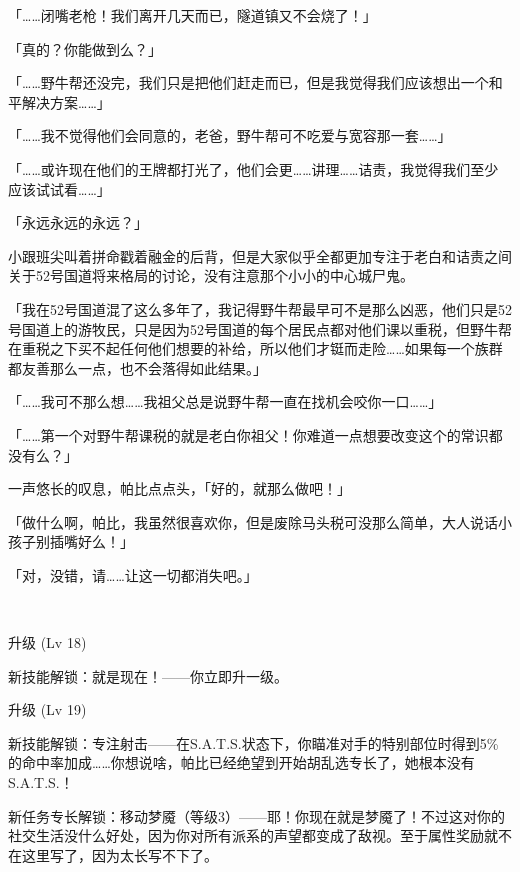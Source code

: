 「……闭嘴老枪！我们离开几天而已，隧道镇又不会烧了！」

「真的？你能做到么？」


「……野牛帮还没完，我们只是把他们赶走而已，但是我觉得我们应该想出一个和平解决方案……」

「……我不觉得他们会同意的，老爸，野牛帮可不吃爱与宽容那一套……」

「……或许现在他们的王牌都打光了，他们会更……讲理……诘责，我觉得我们至少应该试试看……」

「永远永远的永远？」


小跟班尖叫着拼命戳着融金的后背，但是大家似乎全都更加专注于老白和诘责之间关于52号国道将来格局的讨论，没有注意那个小小的中心城尸鬼。

「我在52号国道混了这么多年了，我记得野牛帮最早可不是那么凶恶，他们只是52号国道上的游牧民，只是因为52号国道的每个居民点都对他们课以重税，但野牛帮在重税之下买不起任何他们想要的补给，所以他们才铤而走险……如果每一个族群都友善那么一点，也不会落得如此结果。」

「……我可不那么想……我祖父总是说野牛帮一直在找机会咬你一口……」

「……第一个对野牛帮课税的就是老白你祖父！你难道一点想要改变这个的常识都没有么？」

一声悠长的叹息，帕比点点头，「好的，就那么做吧！」


「做什么啊，帕比，我虽然很喜欢你，但是废除马头税可没那么简单，大人说话小孩子别插嘴好么！」

「对，没错，请……让这一切都消失吧。」


~\vfill

\begin{note}
    升级 (Lv 18) 

    新技能解锁：就是现在！——你立即升一级。

\end{note}

\begin{note}
    升级 (Lv 19) 

    新技能解锁：专注射击——在S.A.T.S.状态下，你瞄准对手的特别部位时得到5\%的命中率加成……你想说啥，帕比已经绝望到开始胡乱选专长了，她根本没有S.A.T.S.！

    新任务专长解锁：移动梦魇（等级3）——耶！你现在就是梦魇了！不过这对你的社交生活没什么好处，因为你对所有派系的声望都变成了敌视。至于属性奖励就不在这里写了，因为太长写不下了。
\end{note}


